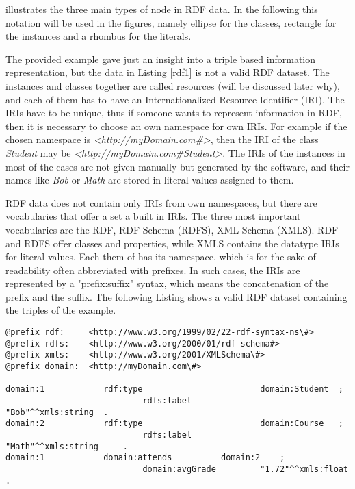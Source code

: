 
 illustrates the three main types of node in RDF data. In the following this notation will be used in the figures, namely ellipse for the classes, rectangle for the instances and a rhombus for the literals.

The provided example gave just an insight into a triple based information representation, but the data in Listing \ref{rdf1} is not a valid RDF dataset. The instances and classes together are called resources (will be discussed later why), and each of them has to have an Internationalized Resource Identifier (IRI). The IRIs have to be unique, thus if someone wants to represent information in RDF, then it is necessary to choose an own namespace for own IRIs. For example if the chosen namespace is \textit{<http://myDomain.com\#>}, then the IRI of the class \textit{Student} may be \textit{<http://myDomain.com\#Student>}. The IRIs of the instances in most of the cases are not given manually but generated by the software, and their names like \textit{Bob} or \textit{Math} are stored in literal values assigned to them.

RDF data does not contain only IRIs from own namespaces, but there are vocabularies that offer a set a built in IRIs. The three most important vocabularies are the RDF, RDF Schema (RDFS), XML Schema (XMLS). RDF and RDFS offer classes and properties, while XMLS contains the datatype IRIs for literal values. Each them of has its namespace, which is for the sake of readability often abbreviated with prefixes. In such cases, the IRIs are represented by a "prefix:suffix" syntax, which means the concatenation of the prefix and the suffix. The following Listing shows a valid RDF dataset containing the triples of the example.

\begin{lstlisting}[basicstyle=\footnotesize, captionpos=b, caption=RDF data in N3 serialization format, label=lst:sparql,  belowskip=1em, aboveskip=2em,
frame=single]
@prefix rdf:  	 <http://www.w3.org/1999/02/22-rdf-syntax-ns\#>
@prefix rdfs:    <http://www.w3.org/2000/01/rdf-schema#>
@prefix xmls:    <http://www.w3.org/2001/XMLSchema\#>
@prefix domain:  <http://myDomain.com\#>

domain:1			rdf:type						domain:Student 	;
							rdfs:label					"Bob"^^xmls:string 	.
domain:2			rdf:type						domain:Course 	;
							rdfs:label					"Math"^^xmls:string 	.
domain:1			domain:attends			domain:2 	;
							domain:avgGrade			"1.72"^^xmls:float .
\end{lstlisting}


